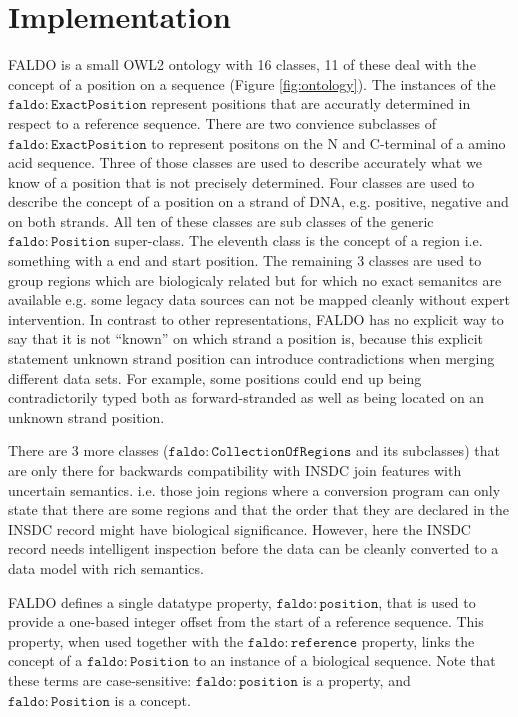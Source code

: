 \section*{Implementation}

FALDO is a small OWL2 ontology with 16 classes, 11 of these deal with the concept of a position on a sequence (Figure \ref{fig:ontology}).
The instances of the $\mathtt{faldo\colon{}ExactPosition}$ represent positions that are accuratly determined in respect to a reference sequence. There are two convience subclasses of $\mathtt{faldo\colon{}ExactPosition}$ to represent positons on the N and C-terminal of a amino acid sequence.
Three of those classes are used to describe accurately what we know of a position that is not precisely determined.
Four classes are used to describe the concept of a position on a strand of DNA, e.g. positive, negative and on both strands.
All ten of these classes are sub classes of the generic $\mathtt{faldo\colon{}Position}$ super-class.
The eleventh class is the concept of a region i.e. something with a end and start position.
The remaining 3 classes are used to group regions which are biologicaly related but for which no exact semanitcs are available e.g. some legacy data sources can not be mapped cleanly without expert intervention.
In contrast to other representations, FALDO has no explicit way to say that it is not ``known'' on which strand a position is, because this explicit statement unknown strand position can introduce contradictions when merging different data sets.
For example, some positions could end up being contradictorily typed both as forward-stranded as well as being located on an unknown strand position.

There are 3 more classes ($\mathtt{faldo\colon{}CollectionOfRegions}$ and its subclasses) that are only there for backwards compatibility with INSDC join features with uncertain semantics. i.e. those join regions where a conversion program can only state that there are some regions and that the order that they are declared in the INSDC record might have biological significance.
However, here the INSDC record needs intelligent inspection before the data can be cleanly converted to a data model with rich semantics.

FALDO defines a single datatype property,
$\mathtt{faldo\colon{}position}$, that is used to provide a one-based
integer offset from the start of a reference sequence.
This property, when used together with the
$\mathtt{faldo\colon{}reference}$ property, links the concept of
a $\mathtt{faldo\colon{}Position}$ to an instance of a biological
sequence.
Note that these terms are case-sensitive:
$\mathtt{faldo\colon{}position}$ is a property, and
$\mathtt{faldo\colon{}Position}$ is a concept.

